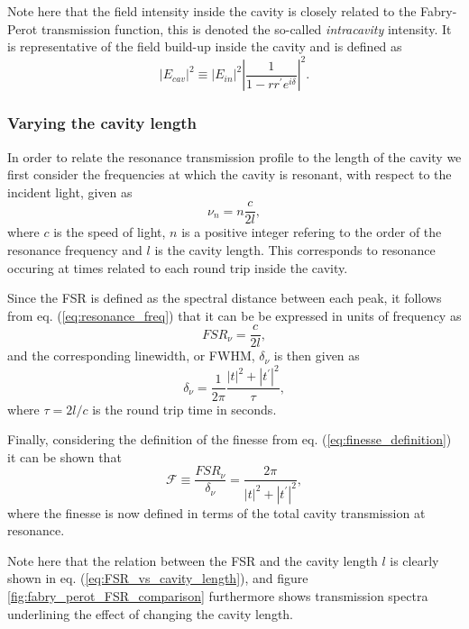 Note here that the field intensity inside the cavity is closely related to the Fabry-Perot transmission function, this is denoted the so-called \emph{intracavity} intensity. It is representative of the field build-up inside the cavity and is defined as 
\begin{equation}
    |E_{cav}|^2 \equiv |E_{in}|^2 \left|\frac{1}{1-rr^{\prime}e^{i\delta}}\right|^2.
    \label{eq:intracavity_intensity}
\end{equation}

\subsubsection{Varying the cavity length}

In order to relate the resonance transmission profile to the length of the cavity we first consider the frequencies at which the cavity is resonant, with respect to the incident light, given as
\begin{equation}
    \nu_n = n \frac{c}{2l},
    \label{eq:resonance_freq}
\end{equation}
where $c$ is the speed of light, $n$ is a positive integer refering to the order of the resonance frequency and $l$ is the cavity length. This corresponds to resonance occuring at times related to each round trip inside the cavity. 

Since the FSR is defined as the spectral distance between each peak, it follows from eq. (\ref{eq:resonance_freq}) that it can be be expressed in units of frequency as 
\begin{equation}
    FSR_{\nu} = \frac{c}{2l},
    \label{eq:FSR_vs_cavity_length}
\end{equation}
and the corresponding linewidth, or FWHM, $\delta_{\nu}$ is then given as
\begin{equation}
    \delta_{\nu} = \frac{1}{2 \pi} \frac{|t|^2 + |t^{\prime}|^2}{\tau},
\end{equation}
where $\tau = 2l/c$ is the round trip time in seconds. 

Finally, considering the definition of the finesse from eq. (\ref{eq:finesse_definition}) it can be shown that
\begin{equation}
    \mathcal{F} \equiv \frac{FSR_{\nu}}{\delta_{\nu}} = \frac{2 \pi}{|t|^2 + |t^{\prime}|^2},
    \label{eq:lossless_finesse}
\end{equation}
where the finesse is now defined in terms of the total cavity transmission at resonance. 

Note here that the relation between the FSR and the cavity length $l$ is clearly shown in eq. (\ref{eq:FSR_vs_cavity_length}), and figure \ref{fig:fabry_perot_FSR_comparison} furthermore shows transmission spectra underlining the effect of changing the cavity length. 

